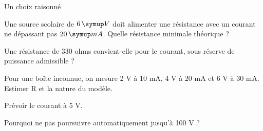 \par\noindent\begin{minipage}{\linewidth}
\begin{exercice}[3]{Un choix raisonné}
\begin{questions}
\item Une source scolaire de $6\unite V$ doit alimenter une résistance avec un courant ne dépassant pas $20\unite{mA}$. Quelle résistance minimale théorique ?
\item Une résistance de 330 ohms convient-elle pour le courant, sous réserve de puissance admissible ?
\end{questions}
\end{exercice}
\end{minipage}
\label{defi-ex-16}
\begin{questions}
\item Pour une boîte inconnue, on mesure 2 V à 10 mA, 4 V à 20 mA et 6 V à 30 mA. Estimer R et la nature du modèle.
\item Prévoir le courant à 5 V.
\item Pourquoi ne pas poursuivre automatiquement jusqu’à 100 V ?
\end{questions}
\pcGrille
